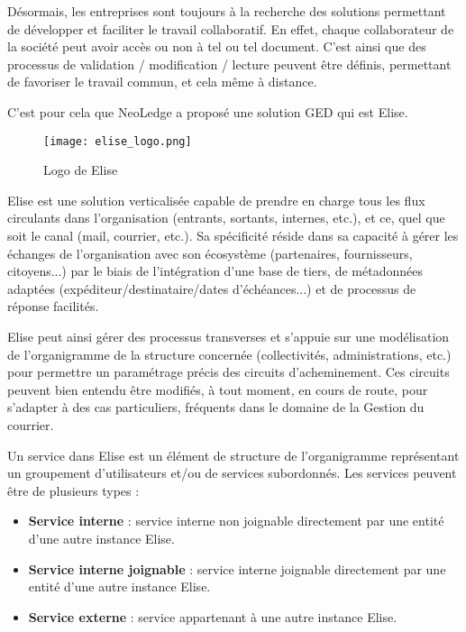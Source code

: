 Désormais, les entreprises sont toujours à la recherche des solutions permettant de développer et faciliter le travail collaboratif. En effet, chaque collaborateur de la société peut avoir accès ou non à tel ou tel document. C'est ainsi que des processus de validation / modification / lecture peuvent être définis, permettant de favoriser le travail commun, et cela même à distance.

C'est pour cela que NeoLedge a proposé une solution GED qui est Elise.

\begin{figure}[!h]
\centering
\texttt{[image: elise\_logo.png]}
\caption{Logo de Elise}
\label{fig:logoElise}
\end{figure}

Elise est une solution verticalisée capable de prendre en charge tous les flux circulants dans l'organisation (entrants, sortants, internes, etc.), et ce, quel que soit le canal (mail, courrier, etc.). Sa  spécificité réside dans sa capacité à gérer les échanges de l'organisation avec son écosystème (partenaires, fournisseurs, citoyens...) par le biais de l'intégration d'une base de tiers, de métadonnées adaptées (expéditeur/destinataire/dates d'échéances...) et de processus de réponse facilités.

Elise peut ainsi gérer des processus transverses et s'appuie sur une modélisation de l'organigramme de la structure concernée (collectivités, administrations, etc.) pour permettre un paramétrage précis des circuits d'acheminement. Ces circuits peuvent bien entendu être modifiés, à tout moment, en cours de route, pour s'adapter à des cas particuliers, fréquents dans le domaine de la Gestion du courrier.

Un service dans Elise est un élément de structure de l'organigramme représentant un groupement d'utilisateurs et/ou de services subordonnés. Les services peuvent être de plusieurs types :

\begin{itemize}
\item \textbf{Service interne} : service interne non joignable directement par une entité d'une autre instance Elise.
\item \textbf{Service interne joignable} : service interne joignable directement par une entité d'une autre instance Elise.
\item \textbf{Service externe} : service appartenant à une autre instance Elise.
\end{itemize}

